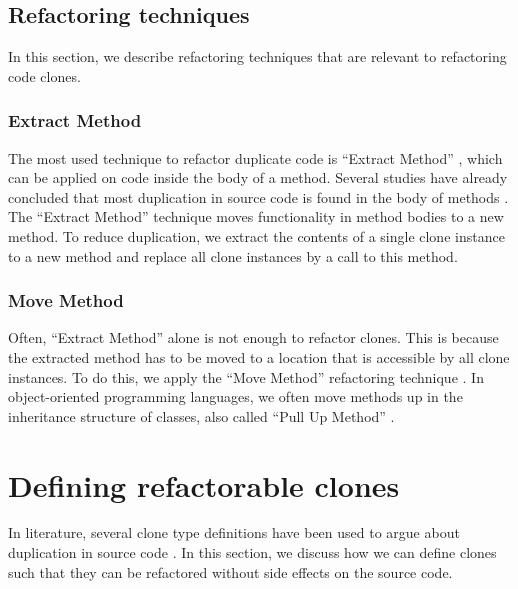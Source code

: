 \documentclass[sigconf,review, table]{acmart}
\begin{document}
\subsection{Refactoring techniques}
In this section, we describe refactoring techniques that are relevant to refactoring code clones.

\subsubsection{Extract Method}
The most used technique to refactor duplicate code is ``Extract Method'' \cite{fowler2018refactoring}, which can be applied on code inside the body of a method. Several studies have already concluded that most duplication in source code is found in the body of methods \cite{lozano2007evaluating, white2016deep, bergman2004ethnographic}. The ``Extract Method'' technique moves functionality in method bodies to a new method. To reduce duplication, we extract the contents of a single clone instance to a new method and replace all clone instances by a call to this method.

\subsubsection{Move Method}
Often, ``Extract Method'' alone is not enough to refactor clones. This is because the extracted method has to be moved to a location that is accessible by all clone instances. To do this, we apply the ``Move Method'' refactoring technique \cite{fowler2018refactoring}. In object-oriented programming languages, we often move methods up in the inheritance structure of classes, also called ``Pull Up Method'' \cite{fowler2018refactoring}.

\section{Defining refactorable clones}
In literature, several clone type definitions have been used to argue about duplication in source code \cite{roy2007survey}. In this section, we discuss how we can define clones such that they can be refactored without side effects on the source code.
\end{document}
